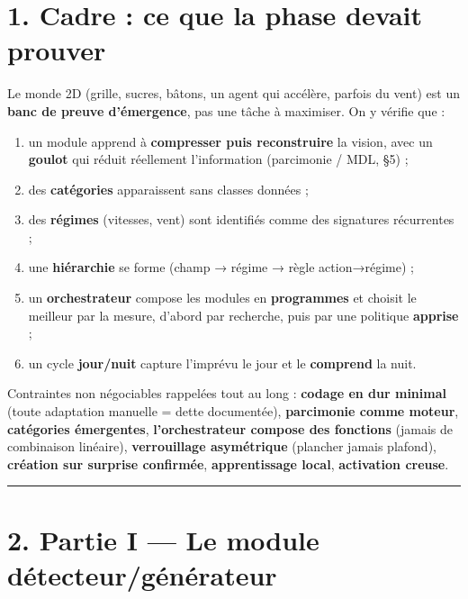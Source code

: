 \documentclass[
  french,
  11pt,
]{article}
\providecommand{\tightlist}{%
  \setlength{\itemsep}{0pt}\setlength{\parskip}{0pt}}
\begin{document}
\section{1. Cadre : ce que la phase devait
prouver}\label{cadre-ce-que-la-phase-devait-prouver}

Le monde 2D (grille, sucres, bâtons, un agent qui accélère, parfois du
vent) est un \textbf{banc de preuve d'émergence}, pas une tâche à
maximiser. On y vérifie que :

\begin{enumerate}
\def\labelenumi{\arabic{enumi}.}
\tightlist
\item
  un module apprend à \textbf{compresser puis reconstruire} la vision,
  avec un \textbf{goulot} qui réduit réellement l'information
  (parcimonie / MDL, §5) ;
\item
  des \textbf{catégories} apparaissent sans classes données ;
\item
  des \textbf{régimes} (vitesses, vent) sont identifiés comme des
  signatures récurrentes ;
\item
  une \textbf{hiérarchie} se forme (champ → régime → règle
  action→régime) ;
\item
  un \textbf{orchestrateur} compose les modules en \textbf{programmes}
  et choisit le meilleur par la mesure, d'abord par recherche, puis par
  une politique \textbf{apprise} ;
\item
  un cycle \textbf{jour/nuit} capture l'imprévu le jour et le
  \textbf{comprend} la nuit.
\end{enumerate}

Contraintes non négociables rappelées tout au long : \textbf{codage en
dur minimal} (toute adaptation manuelle = dette documentée),
\textbf{parcimonie comme moteur}, \textbf{catégories émergentes},
\textbf{l'orchestrateur compose des fonctions} (jamais de combinaison
linéaire), \textbf{verrouillage asymétrique} (plancher jamais plafond),
\textbf{création sur surprise confirmée}, \textbf{apprentissage local},
\textbf{activation creuse}.

\begin{center}\rule{0.5\linewidth}{0.5pt}\end{center}

\section{2. Partie I --- Le module
détecteur/générateur}\label{partie-i-le-module-duxe9tecteurguxe9nuxe9rateur}
\end{document}
